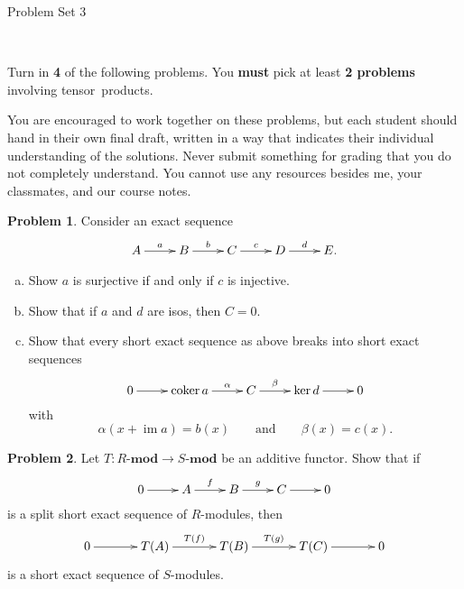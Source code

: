 \documentclass[11pt]{article}
\title{}
\date{\vspace{-0.5in}}
\DeclareMathOperator{\coker}{coker}
\DeclareMathOperator{\im}{im}
\theoremstyle{definition}
\newtheorem{problem}{Problem}
\begin{document}
\thispagestyle{fancy}
\pagestyle{fancy}

\vspace{3em}

\begin{center}
	{\LARGE Problem Set 3}
\end{center}


\


\noindent
Turn in {\bf 4} of the following problems. You {\bf must} pick at least {\bf 2 problems} involving tensor~products.

%
\noindent
You are encouraged to work together on these problems, but each student should hand in their own final draft, written in a way that indicates their individual understanding of the solutions. Never submit something for grading that you do not completely understand. You cannot use any resources besides me, your classmates, and our course notes.

\vspace{0.8em}

\begin{problem}
Consider an exact sequence
$$\xymatrix{A \ar[r]^-a & B \ar[r]^-b & C \ar[r]^-c & D \ar[r]^-d & E.}$$

\begin{enumerate}[a)]
	\item Show $a$ is surjective if and only if $c$ is injective.
\item Show that if $a$ and $d$ are isos, then $C = 0$.
\item Show that every short exact sequence as above
breaks into short exact sequences
$$\xymatrix{0 \ar[r] & \coker a \ar[r]^-\alpha & C \ar[r]^-\beta & \ker d \ar[r] & 0}$$
with
$$\alpha(x + \im a) = b(x) \qquad \textrm{and} \qquad \beta(x) = c(x).$$
\end{enumerate}
\end{problem}


\vspace{0.5em}

\begin{problem}
	Let $T\!: R\textbf{-mod} \longrightarrow S\textbf{-mod}$ be an additive functor. Show that if
	$$\xymatrix{0 \ar[r] & A \ar[r]^-f & B \ar[r]^-g & C \ar[r] & 0}$$
	is a split short exact sequence of $R$-modules, then 
	$$\xymatrix@C=12mm{0 \ar[r] & T(A) \ar[r]^-{T(f)} & T(B) \ar[r]^-{T(g)} & T(C) \ar[r] & 0}$$
is a short exact sequence of $S$-modules.
\end{problem}
\end{document}
